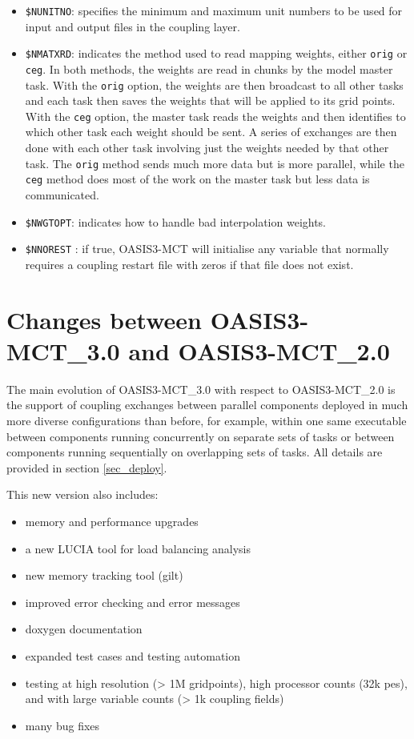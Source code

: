 \begin{itemize}
	\begin{itemize}

	\item {\tt \$NUNITNO}: specifies the minimum and maximum unit numbers to be used for input and output files in the coupling layer.

	\item {\tt \$NMATXRD}: indicates the method used to read mapping weights, either {\tt orig} or {\tt ceg}. In both methods, the weights are read in chunks by the model master task. With the {\tt orig} option, the weights are then broadcast to all other tasks and each task then saves the weights that will be applied to its grid points. With the {\tt ceg} option, the master task reads the weights and then identifies to which other task each weight should be sent.  A series of exchanges are then done with each other task involving just the weights needed by that other task. The {\tt orig} method sends much more data but is more parallel, while the {\tt ceg} method does most of the work on the master task but less data is communicated.

	\item {\tt \$NWGTOPT}: indicates how to handle bad interpolation weights.

	\item {\tt \$NNOREST} : if true, OASIS3-MCT will initialise any variable that normally requires a coupling restart file with zeros if that file does not exist.

	\end{itemize}
\end{itemize}

\section{Changes between OASIS3-MCT\_3.0 and OASIS3-MCT\_2.0}
\label{sec_oa2_oa3}

The main evolution of OASIS3-MCT\_3.0 with respect to OASIS3-MCT\_2.0 is the support of coupling exchanges between parallel components deployed in much more diverse configurations than before, for example, within one same executable between components running concurrently on separate sets of tasks or between components running sequentially on overlapping sets of tasks. All details are provided in section \ref{sec_deploy}.

This new version also includes:
\begin{itemize}
\item memory and performance upgrades
\item a new LUCIA tool for load balancing analysis
\item new memory tracking tool (gilt)
\item improved error checking and error messages
\item doxygen documentation
\item expanded test cases and testing automation
\item testing at high resolution (> 1M gridpoints), high processor counts (32k pes), and with large variable counts (> 1k coupling fields)
\item many bug fixes
\end{itemize}

